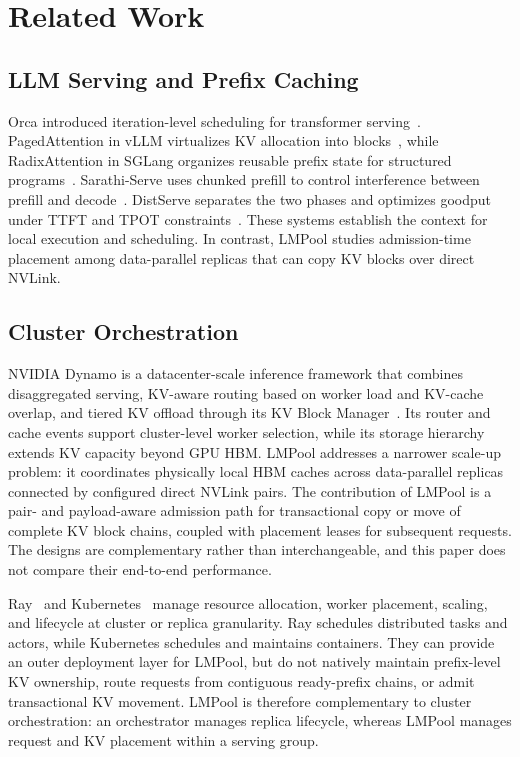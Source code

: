 \documentclass{article}
\newcommand{\sys}{LMPool}
\begin{document}
\section{Related Work}
\label{sec:related}

\subsection{LLM Serving and Prefix Caching}

Orca introduced iteration-level scheduling for transformer serving~\citep{ORCA}. PagedAttention in vLLM virtualizes KV allocation into blocks~\citep{vLLM}, while RadixAttention in SGLang organizes reusable prefix state for structured programs~\citep{SGLang}. Sarathi-Serve uses chunked prefill to control interference between prefill and decode~\citep{SarathiServe}. DistServe separates the two phases and optimizes goodput under TTFT and TPOT constraints~\citep{DistServe}. These systems establish the context for local execution and scheduling. In contrast, \sys{} studies admission-time placement among data-parallel replicas that can copy KV blocks over direct NVLink.

\subsection{Cluster Orchestration}

NVIDIA Dynamo is a datacenter-scale inference framework that combines disaggregated serving, KV-aware routing based on worker load and KV-cache overlap, and tiered KV offload through its KV Block Manager~\citep{NVIDIADynamo}. Its router and cache events support cluster-level worker selection, while its storage hierarchy extends KV capacity beyond GPU HBM. \sys{} addresses a narrower scale-up problem: it coordinates physically local HBM caches across data-parallel replicas connected by configured direct NVLink pairs. The contribution of \sys{} is a pair- and payload-aware admission path for transactional copy or move of complete KV block chains, coupled with placement leases for subsequent requests. The designs are complementary rather than interchangeable, and this paper does not compare their end-to-end performance.

Ray~\citep{Ray} and Kubernetes~\citep{Kubernetes} manage resource allocation, worker placement, scaling, and lifecycle at cluster or replica granularity. Ray schedules distributed tasks and actors, while Kubernetes schedules and maintains containers. They can provide an outer deployment layer for \sys{}, but do not natively maintain prefix-level KV ownership, route requests from contiguous ready-prefix chains, or admit transactional KV movement. \sys{} is therefore complementary to cluster orchestration: an orchestrator manages replica lifecycle, whereas \sys{} manages request and KV placement within a serving group.
\end{document}
